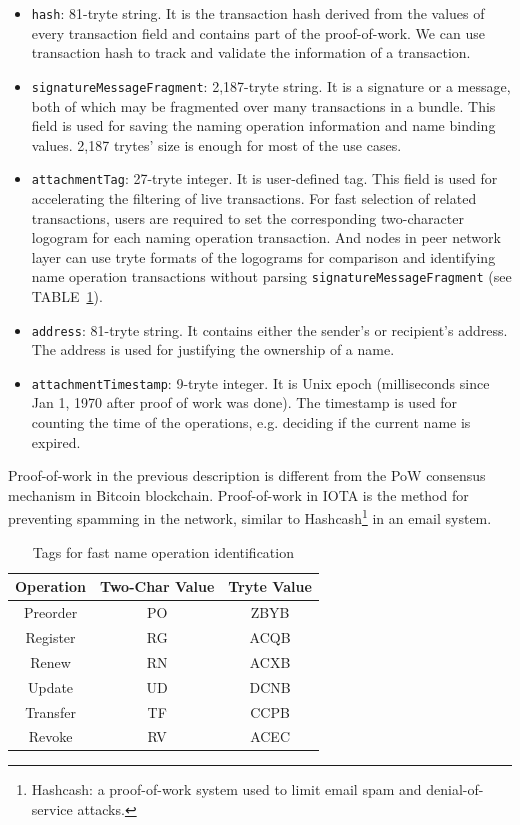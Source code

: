 \begin{itemize}
    \item \texttt{hash}: 81-tryte string. It is the transaction hash derived from the values of every transaction field and contains part of the proof-of-work. We can use transaction hash to track and validate the information of a transaction.
    \item \texttt{signatureMessageFragment}: 2,187-tryte string. It is a signature or a message, both of which may be fragmented over many transactions in a bundle.
          This field is used for saving the naming operation information and name binding values. 2,187 trytes' size is enough for most of the use cases.
    \item \texttt{attachmentTag}: 27-tryte integer. It is user-defined tag. This field is used for accelerating the filtering of live transactions.
          For fast selection of related transactions, users are required to set the corresponding two-character logogram for each naming operation transaction.
          And nodes in peer network layer can use tryte formats of the logograms for comparison and identifying name operation transactions without parsing \texttt{signatureMessageFragment} (see TABLE~\ref{table:tags}).
    \item \texttt{address}: 81-tryte string. It contains either the sender's or recipient's address. The address is used for justifying the ownership of a name.
    \item \texttt{attachmentTimestamp}: 9-tryte integer. It is Unix epoch (milliseconds since Jan 1, 1970 after proof of work was done). The timestamp is used for counting the time of the operations, e.g. deciding if the current name is expired.
\end{itemize}

Proof-of-work in the previous description is different from the PoW consensus mechanism in Bitcoin blockchain.
Proof-of-work in IOTA is the method for preventing spamming in the network, similar to Hashcash\footnote{Hashcash: a proof-of-work system used to limit email spam and denial-of-service attacks.} in an email system.

\begin{table}[h]
    \centering
    \begin{tabular}{||c c c||}
        \hline
        Operation & Two-Char Value & Tryte Value \\ [0.5ex]
        \hline\hline
        Preorder  & PO             & ZBYB        \\
        Register  & RG             & ACQB        \\
        Renew     & RN             & ACXB        \\
        Update    & UD             & DCNB        \\
        Transfer  & TF             & CCPB        \\
        Revoke    & RV             & ACEC        \\ [1ex]
        \hline
    \end{tabular}
    \caption{Tags for fast name operation identification}
    \label{table:tags}
\end{table}

